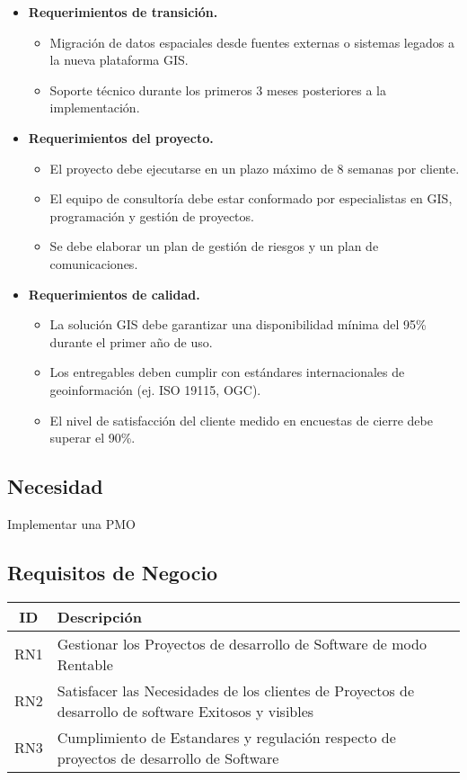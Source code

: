 \begin{itemize}
  \item \textbf{Requerimientos de transición.}
  \begin{itemize}
    \item Migración de datos espaciales desde fuentes externas o sistemas legados a la nueva plataforma GIS.
    \item Soporte técnico durante los primeros 3 meses posteriores a la implementación.
  \end{itemize}

  \item \textbf{Requerimientos del proyecto.}
  \begin{itemize}
    \item El proyecto debe ejecutarse en un plazo máximo de 8 semanas por cliente.
    \item El equipo de consultoría debe estar conformado por especialistas en GIS, programación y gestión de proyectos.
    \item Se debe elaborar un plan de gestión de riesgos y un plan de comunicaciones.
  \end{itemize}

  \item \textbf{Requerimientos de calidad.}
  \begin{itemize}
    \item La solución GIS debe garantizar una disponibilidad mínima del 95\% durante el primer año de uso.
    \item Los entregables deben cumplir con estándares internacionales de geoinformación (ej. ISO 19115, OGC).
    \item El nivel de satisfacción del cliente medido en encuestas de cierre debe superar el 90\%.
  \end{itemize}
\end{itemize}

\newpage

\subsection*{Necesidad}
Implementar una PMO

\subsection*{Requisitos de Negocio}
\begin{tabular}{|c|p{12cm}|}
\hline
\textbf{ID} & \textbf{Descripción} \\
\hline
RN1 & Gestionar los Proyectos de desarrollo de Software de modo Rentable \\
\hline
RN2 & Satisfacer las Necesidades de los clientes de Proyectos de desarrollo de software Exitosos y visibles \\
\hline
RN3 & Cumplimiento de Estandares y regulación respecto de proyectos de desarrollo de Software \\
\hline
\end{tabular}

